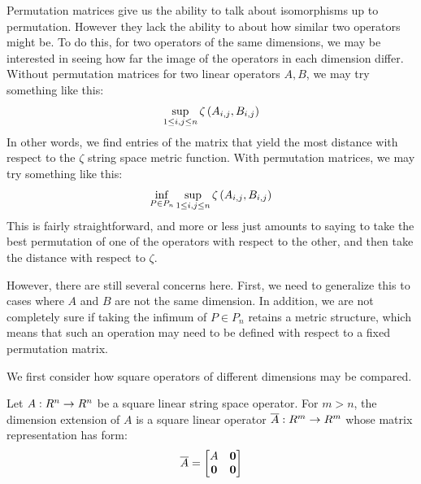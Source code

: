 Permutation matrices give us the ability to talk about
isomorphisms up to permutation.
However they lack the ability to about how similar two operators might be.
To do this, for two operators of the same dimensions,
we may be interested in seeing how far the image of the operators
in each dimension differ.
Without permutation matrices
for two linear operators \(A, B\), we may try something like this:
\begin{align*}
  \sup_{1 \leq i, j \leq n}
    \zeta\left(A_{i, j}, B_{i, j}\right)
\end{align*}
In other words, we find entries of the matrix that yield the most distance
with respect to the \(\zeta\) string space metric function.
With permutation matrices, we may try something like this:
\begin{align*}
  \inf_{P \in P_n} \sup_{1 \leq i, j \leq n}
    \zeta\left(A_{i, j}, B_{i, j}\right)
\end{align*}
This is fairly straightforward, and more or less just amounts to saying
to take the best permutation of one of the operators with respect
to the other, and then take the distance with respect to
\(\zeta\).

However, there are still several concerns here.
First, we need to generalize this to cases where
\(A\) and \(B\) are not the same dimension.
In addition, we are not completely sure if taking the infimum of
\(P \in P_n\) retains a metric structure,
which means that such an operation may need to be defined with respect
to a fixed permutation matrix.

We first consider how square operators of different dimensions may be compared.

\begin{definition}
  Let \(A : R^n \to R^n\) be a square linear string space operator.
  For \(m > n\),
  the dimension extension of \(A\)
  is a square linear operator \(\overline{A} : R^m \to R^m\)
  whose matrix representation has form:
  \begin{align*}
    \overline{A} = \begin{bmatrix} A & \mathbf{0} \\ \mathbf{0} & \mathbf{0} \end{bmatrix}
  \end{align*}
\end{definition}

